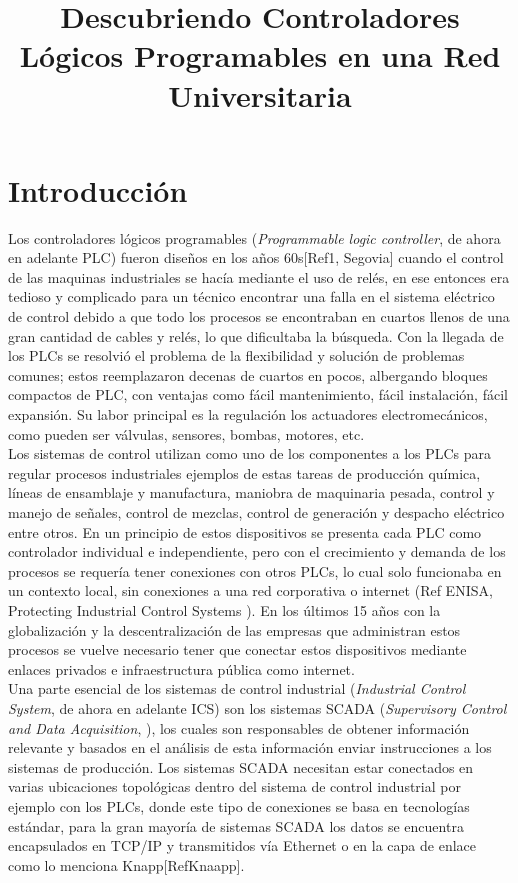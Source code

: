 \documentclass[jou,apacite]{apa6}
\title{Descubriendo Controladores Lógicos Programables en una Red Universitaria}
\begin{document}
\maketitle    
                     
\section{Introducción}
Los controladores lógicos programables (\textit{Programmable logic controller}, de ahora en adelante PLC) fueron diseños en los años 60s[Ref1, Segovia] cuando el control de las maquinas industriales se hacía mediante el uso de relés, en ese entonces era tedioso y complicado para un técnico encontrar una falla en el sistema eléctrico de control debido a que todo los procesos se encontraban en cuartos llenos de  una gran cantidad de cables y relés, lo que dificultaba la búsqueda. Con la llegada de los  PLCs se resolvió el problema de la flexibilidad y solución de problemas comunes; estos reemplazaron decenas de cuartos en pocos, albergando bloques compactos de PLC, con ventajas como fácil mantenimiento, fácil instalación, fácil expansión. Su labor principal es la regulación  los actuadores electromecánicos, como pueden ser válvulas, sensores, bombas, motores, etc.\\

Los sistemas de control utilizan como uno de los componentes a los PLCs  para regular procesos industriales  ejemplos de estas tareas de producción química, líneas de ensamblaje y manufactura, maniobra de maquinaria pesada,  control y manejo de señales, control de mezclas, control de generación y despacho eléctrico entre otros. En un principio de estos dispositivos se presenta cada PLC como controlador individual e independiente, pero con el crecimiento y demanda de los procesos se requería  tener conexiones con otros PLCs, lo cual solo funcionaba en un contexto local, sin conexiones a una red corporativa o internet  (Ref ENISA, Protecting Industrial Control Systems ). En los últimos 15 años con la globalización y la descentralización  de las empresas que administran estos procesos se vuelve necesario tener que conectar estos dispositivos mediante enlaces privados e infraestructura pública como internet.\\

Una parte esencial de los sistemas de control industrial (\textit{Industrial Control System}, de ahora en adelante ICS) son los sistemas SCADA (\textit{Supervisory Control and Data Acquisition}, ), los cuales son responsables de obtener información relevante y basados en el análisis de esta información enviar instrucciones a los sistemas de producción. Los sistemas SCADA necesitan estar conectados en varias ubicaciones topológicas dentro del sistema de control industrial por ejemplo con los PLCs, donde este tipo de conexiones se basa en tecnologías estándar, para la gran mayoría de sistemas SCADA los datos se encuentra encapsulados en TCP/IP y transmitidos vía Ethernet o en la capa de enlace como lo menciona Knapp[RefKnaapp]. 
\end{document}
